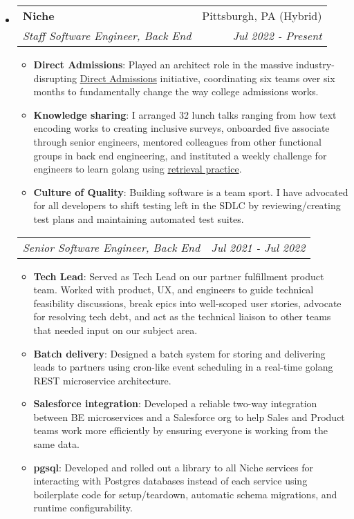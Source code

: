 \documentclass[letterpaper,11pt]{article}
\makeatletter
\newenvironment{resumeHeadingList}{\begin{itemize}[leftmargin=*]}{\end{itemize}}
\newenvironment{resumeItemList}{\begin{itemize}}{\end{itemize}\vspace{-5pt}}
\newcommand{\resumeItem}[2]{
  \item\small{
    \textbf{#1}{: #2 \vspace{-2pt}}
  }
}
\newcommand{\resumeHeading}[4]{
  \vspace{-1pt}\item
    \begin{tabular*}{0.97\textwidth}[t]{l@{\extracolsep{\fill}}r}
      \textbf{#1} & #2 \\
      \textit{\small#3} & \textit{\small #4} \\
    \end{tabular*}\vspace{-5pt}
}
\newcommand{\resumeSubheading}[2]{
    \begin{tabular*}{0.97\textwidth}{l@{\extracolsep{\fill}}r}
      \textit{\small#1} & \textit{\small #2} \\
    \end{tabular*}\vspace{-5pt}
}
\newcommand{\icon}[4]{
  \raisebox{-#4\height}{\href{#2}{\texttt{[image: \#1]}}}
}
\makeatother
\begin{document}
  \begin{resumeHeadingList}

    \resumeHeading
      {\icon{img/niche.png}{https://niche/com}{4ex}{0.25}Niche}{Pittsburgh, PA (Hybrid)}
      {Staff Software Engineer, Back End}{Jul 2022 - Present}
      \begin{resumeItemList}
        \resumeItem{Direct Admissions}{Played an architect role in the massive industry-disrupting \href{https://www.niche.com/about/direct-admissions/}{Direct Admissions} initiative, coordinating six teams over six months to fundamentally change the way college admissions works.}
        \resumeItem{Knowledge sharing}{I arranged 32 lunch talks ranging from how text encoding works to creating inclusive surveys, onboarded five associate through senior engineers, mentored colleagues from other functional groups in back end engineering, and instituted a weekly challenge for engineers to learn golang using \href{https://psychology.ucsd.edu/undergraduate-program/undergraduate-resources/academic-writing-resources/effective-studying/retrieval-practice.html}{retrieval practice}.}
        \resumeItem{Culture of Quality}{Building software is a team sport. I have advocated for all developers to shift testing left in the SDLC by reviewing/creating test plans and maintaining automated test suites.}
      \end{resumeItemList}
      \resumeSubheading
        {Senior Software Engineer, Back End}{Jul 2021 - Jul 2022}
        \begin{resumeItemList}
          \resumeItem{Tech Lead}{Served as Tech Lead on our partner fulfillment product team. Worked with product, UX, and engineers to guide technical feasibility discussions, break epics into well-scoped user stories, advocate for resolving tech debt, and act as the technical liaison to other teams that needed input on our subject area.}
          \resumeItem{Batch delivery}{Designed a batch system for storing and delivering leads to partners using cron-like event scheduling in a real-time golang REST microservice architecture.}
          \resumeItem{Salesforce integration}{Developed a reliable two-way integration between BE microservices and a Salesforce org to help Sales and Product teams work more efficiently by ensuring everyone is working from the same data.}
          \resumeItem{pgsql}{Developed and rolled out a library to all Niche services for interacting with Postgres databases instead of each service using boilerplate code for setup/teardown, automatic schema migrations, and runtime configurability.}

\end{resumeItemList}
\end{resumeHeadingList}
\end{document}
